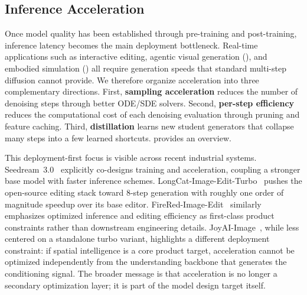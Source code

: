 \subsection{Inference Acceleration}
\label{subsec:acceleration}

Once model quality has been established through pre-training and post-training, inference latency becomes the main deployment bottleneck. Real-time applications such as interactive editing, agentic visual generation (), and embodied simulation () all require generation speeds that standard multi-step diffusion cannot provide. We therefore organize acceleration into three complementary directions. First, \textbf{sampling acceleration} reduces the number of denoising steps through better ODE/SDE solvers. Second, \textbf{per-step efficiency} reduces the computational cost of each denoising evaluation through pruning and feature caching. Third, \textbf{distillation} learns new student generators that collapse many steps into a few learned shortcuts.  provides an overview.

This deployment-first focus is visible across recent industrial systems. Seedream~3.0~\citep{gao2025seedream} explicitly co-designs training and acceleration, coupling a stronger base model with faster inference schemes. LongCat-Image-Edit-Turbo~\citep{team2025longcat} pushes the open-source editing stack toward 8-step generation with roughly one order of magnitude speedup over its base editor. FireRed-Image-Edit~\citep{team2026firered} similarly emphasizes optimized inference and editing efficiency as first-class product constraints rather than downstream engineering details. JoyAI-Image~\citep{jdjoyaiimage}, while less centered on a standalone turbo variant, highlights a different deployment constraint: if spatial intelligence is a core product target, acceleration cannot be optimized independently from the understanding backbone that generates the conditioning signal. The broader message is that acceleration is no longer a secondary optimization layer; it is part of the model design target itself.

